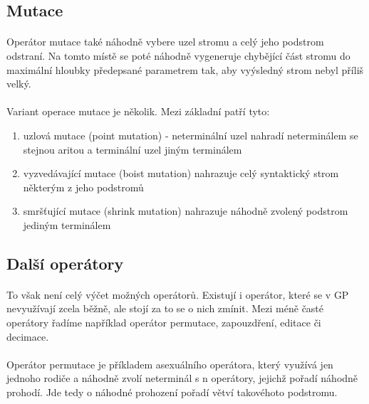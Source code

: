 \documentclass[bc,male,java,dept460]{diploma}		%
\begin{document}
\subsection{Mutace}
\paragraph*{}
Operátor mutace také náhodně vybere uzel stromu a celý jeho podstrom odstraní. Na tomto místě se poté náhodně vygeneruje chybějící část stromu do maximální hloubky předepsané parametrem tak, aby vyýsledný strom nebyl příliš velký. 


\paragraph*{}
Variant operace mutace je několik. Mezi základní patří tyto:
\begin{enumerate}
\item uzlová mutace (point mutation) - neterminální uzel nahradí neterminálem se stejnou aritou a terminální uzel jiným terminálem
\item vyzvedávající mutace (boist mutation) nahrazuje celý syntaktický strom některým z jeho podstromů
\item smršťující mutace (shrink mutation) nahrazuje náhodně zvolený podstrom jediným terminálem
\end{enumerate}

\subsection{Další operátory}
\paragraph*{}
To však není celý výčet možných operátorů. Existují i operátor, které se v GP nevyužívají zcela běžně, ale stojí za to se o nich zmínit. Mezi méně časté operátory řadíme například operátor permutace, zapouzdření, editace či decimace.

\paragraph*{}
Operátor permutace je příkladem asexuálního operátora, který využívá jen jednoho rodiče a náhodně zvolí neterminál s n operátory, jejichž pořadí náhodně prohodí. Jde tedy o náhodné prohození pořadí větví takovéhoto podstromu.
\end{document}
